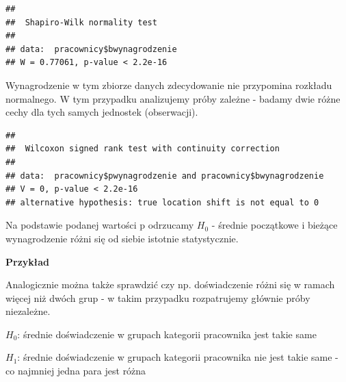 \documentclass[]{book}
\newenvironment{Shaded}{\begin{snugshade}}{\end{snugshade}}
\newcommand{\DataTypeTok}[1]{\textcolor[rgb]{0.13,0.29,0.53}{#1}}
\newcommand{\KeywordTok}[1]{\textcolor[rgb]{0.13,0.29,0.53}{\textbf{#1}}}
\newcommand{\NormalTok}[1]{#1}
\newcommand{\OperatorTok}[1]{\textcolor[rgb]{0.81,0.36,0.00}{\textbf{#1}}}
\newcommand{\OtherTok}[1]{\textcolor[rgb]{0.56,0.35,0.01}{#1}}
\newcommand{\StringTok}[1]{\textcolor[rgb]{0.31,0.60,0.02}{#1}}
\begin{document}
\begin{Shaded}
\end{Shaded}

\begin{verbatim}
## 
##  Shapiro-Wilk normality test
## 
## data:  pracownicy$bwynagrodzenie
## W = 0.77061, p-value < 2.2e-16
\end{verbatim}

Wynagrodzenie w tym zbiorze danych zdecydowanie nie przypomina rozkładu normalnego. W tym przypadku analizujemy próby zależne - badamy dwie różne cechy dla tych samych jednostek (obserwacji).

\begin{Shaded}
\end{Shaded}

\begin{verbatim}
## 
##  Wilcoxon signed rank test with continuity correction
## 
## data:  pracownicy$pwynagrodzenie and pracownicy$bwynagrodzenie
## V = 0, p-value < 2.2e-16
## alternative hypothesis: true location shift is not equal to 0
\end{verbatim}

Na podstawie podanej wartości p odrzucamy \(H_0\) - średnie początkowe i bieżące wynagrodzenie różni się od siebie istotnie statystycznie.

\textbf{Przykład}

Analogicznie można także sprawdzić czy np. doświadczenie różni się w ramach więcej niż dwóch grup - w takim przypadku rozpatrujemy głównie próby niezależne.

\(H_0\): średnie doświadczenie w grupach kategorii pracownika jest takie same

\(H_1\): średnie doświadczenie w grupach kategorii pracownika nie jest takie same - co najmniej jedna para jest różna

\begin{Shaded}
\end{Shaded}
\end{document}
